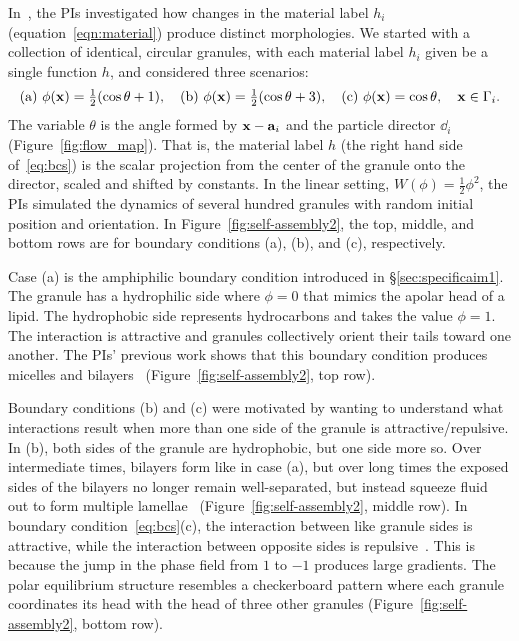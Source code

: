 In~\cite{fu-ryh-qua-you2022}, the PIs investigated how changes in the
material label $h_i$ (equation~\eqref{eqn:material}) produce distinct
morphologies. We started with a collection of identical, circular
granules, with each material label $h_i$ given be a single function $h$,
and considered three scenarios:
\begin{equation}
  \label{eq:bcs}
   \text{(a) }  \phi(\mathbf{x}) = \tfrac{1}{2}(\cos \theta + 1),\quad
   \text{(b)  } \phi(\mathbf{x}) = \tfrac{1}{2}(\cos \theta + 3),\quad
   \text{(c) }  \phi(\mathbf{x}) = \cos \theta, \quad \mathbf{x} \in \Gamma_i.
\end{equation}
The variable $\theta$ is the angle formed by $\mathbf{x}-\mathbf{a}_i$ and the
particle director $\dd_i$ (Figure~\ref{fig:flow_map}). That is, the
material label $h$ (the right hand side of~\eqref{eq:bcs}) is the scalar
projection from the center of the granule onto the director, scaled and
shifted by constants. In the linear setting, $W(\phi) =
\tfrac{1}{2}\phi^2$, the PIs simulated the dynamics of several hundred
granules with random initial position and orientation. In
Figure~\ref{fig:self-assembly2}, the top, middle, and bottom rows are
for boundary conditions (a), (b), and (c), respectively. 

Case (a) is the amphiphilic boundary condition introduced in
\S\ref{sec:specificaim1}. The granule has a hydrophilic side where $\phi
= 0$ that mimics the apolar head of a lipid. The hydrophobic side
represents hydrocarbons and takes the value $\phi = 1$. The interaction
is attractive and granules collectively orient their tails toward one
another. The PIs' previous work shows that this boundary condition
produces micelles and bilayers~\cite{Fu2018_SIAM}
(Figure~\ref{fig:self-assembly2}, top row).

Boundary conditions (b) and (c) were motivated by wanting to understand
what interactions result when more than one side of the granule is
attractive/repulsive. In (b), both sides of the granule are hydrophobic,
but one side more so. Over intermediate times, bilayers form like in
case (a), but over long times the exposed sides of the bilayers no
longer remain well-separated, but instead squeeze fluid out to form
multiple lamellae~\cite{Huetal19, deMeetal21}
(Figure~\ref{fig:self-assembly2}, middle row). In boundary
condition~\eqref{eq:bcs}(c), the interaction between like granule sides
is attractive, while the interaction between opposite sides is
repulsive~\cite{MaRa76, Ma77}. This is because the jump in the phase
field from $1$ to $-1$ produces large gradients. The polar equilibrium
structure resembles a checkerboard pattern where each granule
coordinates its head with the head of three other granules
(Figure~\ref{fig:self-assembly2}, bottom row).

